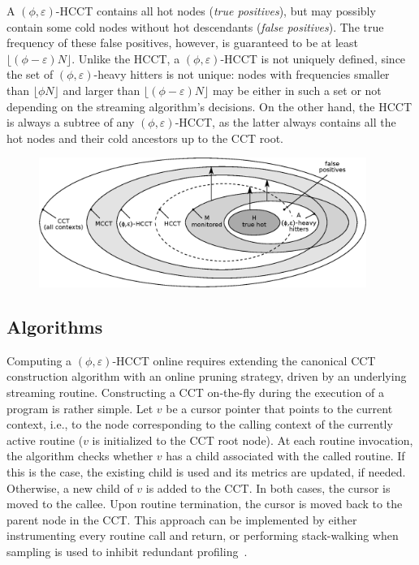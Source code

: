 \noindent A $(\phi,\varepsilon)$-HCCT contains all hot nodes ({\em true positives}), but may possibly contain some cold nodes without hot descendants ({\em false positives}). The true frequency of these false positives, however, is guaranteed to be at least $\lfloor(\phi-\varepsilon) N\rfloor$. Unlike the HCCT, a $(\phi,\varepsilon)$-HCCT is not uniquely defined, since the set of $(\phi,\varepsilon)$-heavy hitters is not unique: nodes with frequencies smaller than $\lfloor\phi N\rfloor$ and larger than $\lfloor(\phi-\varepsilon) N\rfloor$ may be either in such a set or not depending on the streaming algorithm's decisions.
On the other hand, the HCCT is always a subtree of any $(\phi,\varepsilon)$-HCCT, as the latter always contains all the hot nodes and their cold ancestors up to the CCT root.

\ifdefined\noauthorea
\begin{figure}[ht]
\centering
\includegraphics[width=0.95\textwidth]{figures/hcct-venn/hcct-venn.eps}
\caption{\protect}
\end{figure}
\fi

\subsection{Algorithms}
\label{ss:hcct-algorithms}

Computing a $(\phi,\varepsilon)$-HCCT online requires extending the canonical CCT construction algorithm with an online pruning strategy, driven by an underlying streaming routine. Constructing a CCT on-the-fly during the execution of a program is rather simple. Let $v$ be a cursor pointer that points to the current context, i.e., to the node corresponding to the calling context of the currently active routine ($v$ is initialized to the CCT root node). At each routine invocation, the algorithm checks whether $v$ has a child associated with the called routine. If this is the case, the existing child is used and its metrics are updated, if needed. Otherwise, a new child of $v$ is added to the CCT. In both cases, the cursor is moved to the callee. Upon routine termination, the cursor is moved back to the parent node in the CCT. This approach can be implemented by either instrumenting every routine call and return, or performing stack-walking when sampling is used to inhibit redundant profiling~\cite{Arnold00,Whaley00,Zhuang06}.

